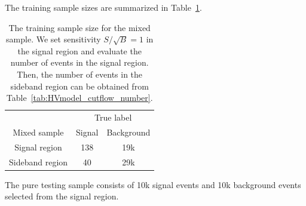 \documentclass[12pt]{article}
\begin{document}
        The training sample sizes are summarized in Table~\ref{tab:training_sample_size_cwola_hunting_hv}.
        \begin{table}[htpb]
            \centering
            \caption{The training sample size for the mixed sample. We set sensitivity $S / \sqrt{B} = 1$ in the signal region and evaluate the number of events in the signal region. Then, the number of events in the sideband region can be obtained from Table~\ref{tab:HVmodel_cutflow_number}.}
            \label{tab:training_sample_size_cwola_hunting_hv}
            \begin{tabular}{c|cc}
                                & \multicolumn{2}{c}{True label} \\
                Mixed sample    & Signal       & Background      \\ \hline
                Signal region   & 138          & 19k             \\
                Sideband region & 40           & 29k
            \end{tabular}
        \end{table} 

        The pure testing sample consists of 10k signal events and 10k background events selected from the signal region.
\end{document}
